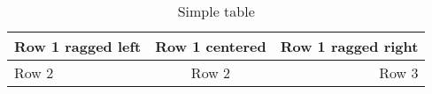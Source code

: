 \documentclass[12pt]{article}
\begin{document}
\blindtext
\begin{table}[h]
\begin{center}
	\begin{tabular}{l|c|r}
		Row 1 ragged left  & Row 1 centered & Row 1 ragged right \\ 
		\hline
		Row 2 & Row 2 & Row 3  \\
	\end{tabular}
\end{center}
\caption{Simple table}
\end{table}
\blindtext
\end{document}

